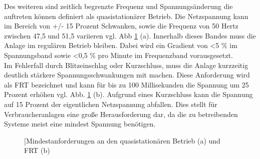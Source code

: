 Des weiteren sind zeitlich begrenzte Frequenz und Spannungsänderung die auftreten können definiert als quasistationärer Betrieb. Die Netzspannung kann im Bereich von +/- 15 Prozent Schwanken, sowie die Frequenz von 50 Hertz zwischen 47,5 und 51,5 variieren vgl. Abb \ref{fig:vde4120-Anforderungen} (a). Innerhalb dieses Bandes muss die Anlage im regulären Betrieb bleiben. Dabei wird ein Gradient von  <5 \%  im Spannungsband sowie <0,5 \% pro Minute im Frequenzband vorausgesetzt. \\
Im Fehlerfall durch Blitzeinschlag oder Kurzschluss, muss die Anlage kurzzeitig deutlich stärkere Spannungsschwankungen mit machen. Diese Anforderung wird als \gls{FRT} bezeichnet und kann für bis zu 100 Millisekunden die Spannung um 25 Prozent erhöhen vgl. Abb. \ref{fig:vde4120-Anforderungen} (b). Aufgrund eines Kurzschluss kann die Spannung auf 15 Prozent der eigentlichen Netzspannung abfallen. Dies stellt für Verbraucheranlagen eine große Herausforderung dar, da die zu betreibenden Systeme meist eine mindest Spannung benötigen.

\begin{figure}[H]
\centering
{}%

\qquad
{}%

\caption[quasistationären Betrieb (a) und \gls{FRT} (b)]{[Mindestanforderungen an den quasistationären Betrieb (a) und \gls{FRT} (b)}
\label{fig:vde4120-Anforderungen}
\end{figure}





